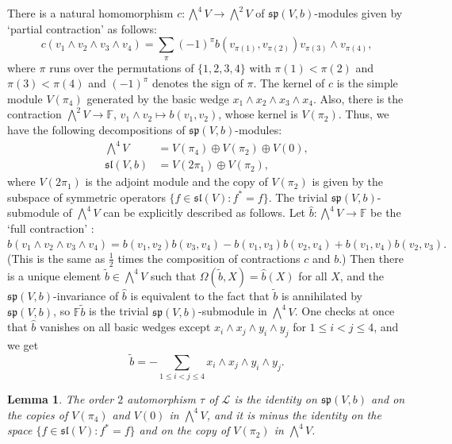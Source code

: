 \documentclass[a4paper,reqno]{amsart}
\newtheorem{lemma}[theorem]{Lemma}
\theoremstyle{definition}
\numberwithin{theorem}{section}
\numberwithin{equation}{section}
\begin{document}
There is a natural homomorphism $c:\bigwedge^4V\rightarrow \bigwedge^2V$ of  ${{\mathfrak{sp}}}(V,b)$-modules given by `partial contraction' as follows: 
\[
c(v_1\wedge v_2\wedge v_3\wedge v_4)=\sum_{\pi}(-1)^\pi b(v_{\pi(1)},v_{\pi(2)})v_{\pi(3)}\wedge v_{\pi(4)},
\]
where $\pi$ runs over the permutations of $\{1,2,3,4\}$ with $\pi(1)<\pi(2)$ and $\pi(3)<\pi(4)$ and $(-1)^\pi$ denotes the sign of $\pi$. The kernel of $c$ is the simple module $V({\pi}_4)$ generated by the basic wedge $x_1\wedge x_2\wedge x_3\wedge x_4$. Also, there is the contraction $\bigwedge^2V\rightarrow {\mathbb{F}}$, $v_1\wedge v_2\mapsto b(v_1,v_2)$, whose kernel is $V({\pi}_2)$. Thus, we have the following decompositions of ${{\mathfrak{sp}}}(V,b)$-modules:
\begin{align*}
\textstyle \bigwedge^4V&=V({\pi}_4)\oplus V({\pi}_2)\oplus V(0),\\
{{\mathfrak{sl}}}(V,b)&=V(2{\pi}_1)\oplus V({\pi}_2),
\end{align*} 
where $V(2{\pi}_1)$ is the adjoint module and the copy of $V({\pi}_2)$ is given by the subspace of symmetric operators $\{f\in{{\mathfrak{sl}}}(V): f^*=f\}$. The trivial ${{\mathfrak{sp}}}(V,b)$-submodule of $\bigwedge^4 V$ can be explicitly described as follows. Let $\hat b:\bigwedge^4V\rightarrow {\mathbb{F}}$ be the `full contraction' :
\[
\hat b(v_1\wedge v_2\wedge v_3\wedge v_4)=b(v_1,v_2)b(v_3,v_4)-b(v_1,v_3)b(v_2,v_4)+b(v_1,v_4)b(v_2,v_3).
\]
(This is the same as $\frac12$ times the composition of contractions $c$ and $b$.)
Then there is a unique element $\tilde b\in\bigwedge^4V$ such that $\Omega(\tilde b,X)=\hat b(X)$ for all $X$, and the ${{\mathfrak{sp}}}(V,b)$-invariance of $\hat b$ is equivalent to the fact that $\tilde b$ is annihilated by ${{\mathfrak{sp}}}(V,b)$, so ${\mathbb{F}}\tilde b$ is the trivial ${{\mathfrak{sp}}}(V,b)$-submodule in $\bigwedge^4V$. One checks at once that $\hat b$ vanishes on all basic wedges except $x_i\wedge x_j\wedge y_i\wedge y_j$ for $1\leq i<j\leq 4$, and we get 
\[
\tilde b=-\sum_{1\leq i<j\leq 4}x_i\wedge x_j\wedge y_i\wedge y_j.
\]

\begin{lemma}\label{le:tau}
The order $2$ automorphism $\tau$ of ${\mathcal{L}}$ is the identity on ${{\mathfrak{sp}}}(V,b)$ and on the copies of $V({\pi}_4)$ and $V(0)$ in $\bigwedge^4V$, and it is minus the identity on the space $\{f\in{{\mathfrak{sl}}}(V):f^*=f\}$ and on the copy of $V({\pi}_2)$ in $\bigwedge^4V$.
\end{lemma}
\end{document}
